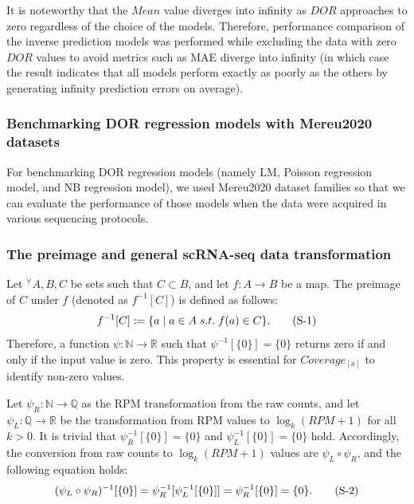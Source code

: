 \documentclass{article}
\begin{document}
It is noteworthy that the $Mean$ value diverges into infinity as $DOR$ approaches to zero regardless of the choice 
of the models. Therefore, performance comparison of the inverse prediction models was performed while excluding the data 
with zero $DOR$ values to avoid metrics such as MAE diverge into infinity (in which case the result indicates 
that all models perform exactly as poorly as the others by generating infinity prediction errors on average).

\subsubsection*{Benchmarking DOR regression models with Mereu2020 datasets}
For benchmarking DOR regression models (namely LM, Poisson regression model, and NB regression model), we 
used Mereu2020 dataset families so that we can evaluate the performance of those models when the data were 
acquired in various sequencing protocols.

\subsubsection*{
  The preimage and general scRNA-seq data transformation
}
Let $^\forall A,B,C$ be sets such that $C\subset B$, and let $f:A\rightarrow B$ be a map. 
The preimage of $C$ under $f$ (denoted as $f^{-1}[C]$) is defined as follows:
\begin{equation}\label{preimage}
  f^{-1}[C]:=\{a\;|\;a\in A\;s.t.\;f(a)\in C\}.
  \stepcounter{equation} \tag{S-\theequation}
\end{equation}
Therefore, a function $\psi: \mathbb{N}\rightarrow\mathbb{R}$ such that $\psi^{-1}[\{0\}]=\{0\}$ returns zero 
if and only if the input value is zero. This property is essential for $Coverage_{[x]}$ to identify non-zero values.

Let $\psi_R:\mathbb{N}\rightarrow \mathbb{Q}$ as the RPM transformation from the raw counts, and let $\psi_L:\mathbb{Q}\rightarrow \mathbb{R}$ be the transformation 
from RPM values to $\log_k(RPM+1)$ for all $k>0$. It is trivial that $\psi_R^{-1}[\{0\}]=\{0\}$ and $\psi_L^{-1}[\{0\}]=\{0\}$ hold.
Accordingly, the conversion from raw counts to $\log_k(RPM+1)$ values are $\psi_L\circ\psi_R$, and the following equation holds:
\begin{equation}\label{raw2logrpm}
  (\psi_L\circ\psi_R)^{-1}[\{0\}]=\psi_R^{-1}[\psi_L^{-1}[\{0\}]]=\psi_R^{-1}[\{0\}]=\{0\}.
  \stepcounter{equation} \tag{S-\theequation}
\end{equation}
\end{document}
